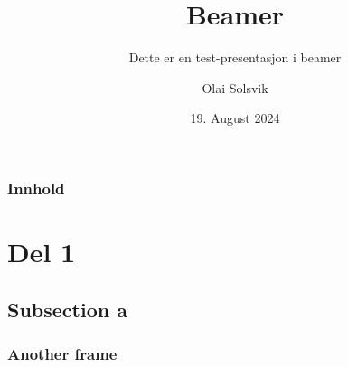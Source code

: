 \newcommand*{\shared}{../shared}


\title{Beamer}
\subtitle{Dette er en test-presentasjon i beamer}
\author{Olai Solsvik}
\date{19. August 2024}


\begin{frame}
  \titlepage
\end{frame}

\begin{frame}
  \frametitle{Innhold}
  \tableofcontents
\end{frame}

\section{Del 1}
\subsection{Subsection a}
\begin{frame}
  \frametitle{Another frame}
  \lipsum[1]
\end{frame}

